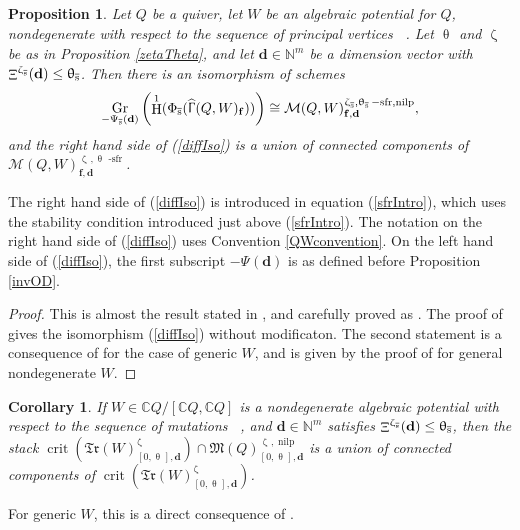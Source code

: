 \documentclass[a4paper,10pt]{amsart}
\newtheorem{proposition}[theorem]{Proposition}
\newtheorem{corollary}[theorem]{Corollary}
\newcommand{\dd}{\mathbf{d}}
\newcommand{\ff}{\mathbf{f}}
\DeclareMathOperator{\sfr}{-sfr}
\newcommand{\WWW}{\mathfrak{Tr}(W)}
\newcommand{\Mst}{\mathfrak{M}}
\newcommand{\Msp}{\mathcal{M}}
\renewcommand{\theta}{\uptheta}
\renewcommand{\zeta}{\upzeta}
\renewcommand{\Gamma}{\Upgamma}
\DeclareMathOperator{\nilp}{nilp}
\DeclareMathOperator{\crit}{crit}
\DeclareMathOperator{\Mu}{\Upxi}
\DeclareMathOperator{\Gr}{Gr}
\DeclareMathOperator{\HGamma}{\widehat{\Gamma}}
\DeclareMathOperator{\Ss}{\overline{s}}
\DeclareMathOperator{\HO}{H}
\begin{document}
\begin{proposition}
\label{eqSchemes}
Let $Q$ be a quiver, let $W$ be an algebraic potential for $Q$, nondegenerate with respect to the sequence of principal vertices $\Ss$.  Let $\theta_{\Ss}$ and $\zeta_{\Ss}$ be as in Proposition \ref{zetaTheta}, and let $\dd\in\mathbb{N}^m$ be a dimension vector with $\Mu^{\zeta_{\Ss}}(\dd)\leq \theta_{\Ss}$.  Then there is an isomorphism of schemes
\begin{equation}
\label{diffIso}
\Gr_{{}-\Psi_{\Ss}(\dd)}\left(\HO^1(\Phi_{\Ss}(\HGamma(Q,W)_{\ff}))\right)\cong \Msp(Q,W)^{\zeta_{\Ss},\theta_{\Ss}\sfr,\nilp}_{\ff,\dd},
\end{equation}
and the right hand side of (\ref{diffIso}) is a union of connected components of $\Msp(Q,W)^{\zeta_{\Ss},\theta_{\Ss}\sfr}_{\ff,\dd}$.
\end{proposition}
The right hand side of (\ref{diffIso}) is introduced in equation (\ref{sfrIntro}), which uses the stability condition introduced just above (\ref{sfrIntro}).  The notation on the right hand side of (\ref{diffIso}) uses Convention \ref{QWconvention}.  On the left hand side of (\ref{diffIso}), the first subscript $-\Psi_{\Ss}(\dd)$ is as defined before Proposition \ref{invOD}.  
\begin{proof}
This is almost the result stated in \cite[Prop.6.3]{Efi11}, and carefully proved as \cite[Prop.4.35]{DMSS13}.  The proof of \cite[Prop.4.35]{DMSS13} gives the isomorphism (\ref{diffIso}) without modificaton.  The second statement is a consequence of \cite[Prop.3.1]{Efi11} for the case of generic $W$, and is given by the proof of \cite[Prop.4.28]{DMSS13} for general nondegenerate $W$.
\end{proof}
\begin{corollary}
\label{allW}
If $W\in\mathbb{C}Q/[\mathbb{C}Q,\mathbb{C}Q]$ is a nondegenerate algebraic potential with respect to the sequence of mutations $\Ss$, and $\dd\in\mathbb{N}^m$ satisfies $\Mu^{{\zeta}_{\Ss}}(\dd)\leq \theta_{\Ss}$, then the stack $\crit\left(\WWW_{[0,\theta_{\Ss}],\dd}^{\zeta_{\Ss}}\right)\cap\Mst(Q)_{[0,\theta_{\Ss}],\dd}^{\zeta_{\Ss},\nilp}$ is a union of connected components of $\crit(\WWW_{[0,\theta_{\Ss}],\dd}^{\zeta_{\Ss}})$.
\end{corollary}
For generic $W$, this is a direct consequence of \cite[Prop.3.1]{Efi11}.
\end{document}
